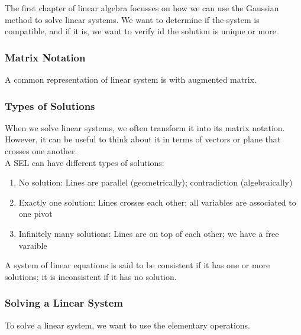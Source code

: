 \documentclass{article}
\begin{document}

The first chapter of linear algebra focusses on how we can use the Gaussian
method to solve linear systems. We want to determine if the system is compatible,
and if it is, we want to verify id the solution is unique or more.

\subsubsection{Matrix Notation}

A common representation of linear system is with augmented matrix.

\subsubsection{Types of Solutions}

When we solve linear systems, we often transform it into its matrix notation.
However, it can be useful to think about it in terms of vectors or plane that
crosses one another.\\

A SEL can have different types of solutions:

\begin{enumerate}
    \item No solution: Lines are parallel (geometrically); contradiction (algebraically)
    \item Exactly one solution: Lines crosses each other; all variables are associated to one pivot
    \item Infinitely many solutions: Lines are on top of each other; we have a free varaible
\end{enumerate}

\begin{definition}
    A system of linear equations is said to be consistent if it has one or more
    solutions; it is inconsistent if it has no solution.
\end{definition}

\subsubsection{Solving a Linear System}

To solve a linear system, we want to use the elementary operations.
\end{document}
